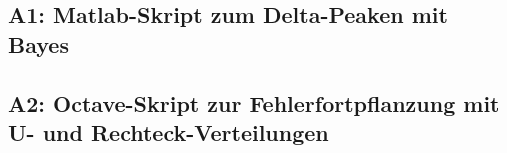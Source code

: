 \subsection{A1: Matlab-Skript zum Delta-Peaken mit Bayes}

\subsection{A2: Octave-Skript zur Fehlerfortpflanzung mit U- und Rechteck-Verteilungen}

